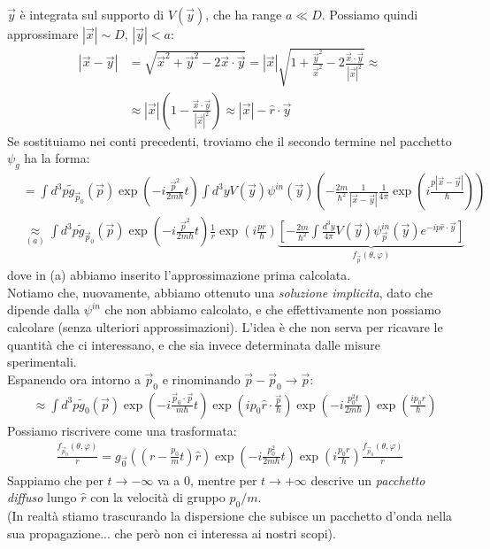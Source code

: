 \documentclass[../../FisicaTeorica.tex]{subfiles}
\begin{document}
$\vec{y}$ è integrata sul supporto di $V(\vec{y})$, che ha range $a \ll D$. Possiamo quindi approssimare $|\vec{x}|\sim D$, $|\vec{y}| < a$:
\begin{align*}
|\vec{x}-\vec{y}|&=\sqrt{\vec{x}^2 + \vec{y}^2 -2\vec{x}\cdot \vec{y}} =|\vec{x}| \sqrt{1+ \frac{\vec{y}^2}{\vec{x}^2} -2\frac{\vec{x}\cdot \vec{y}}{|\vec{x}|^2}} \approx\\
&\approx |\vec{x}| \left(1-\frac{\vec{x}\cdot \vec{y}}{|\vec{x}|^2}\right) \approx |\vec{x}| - \hat{r}\cdot \vec{y}
\end{align*}
Se sostituiamo nei conti precedenti, troviamo che il secondo termine nel pacchetto $\psi_g$ ha la forma:
\begin{align*}
&=\int d^3 p \tilde{g}_{\vec{p}_0}(\vec{p}) \exp\left(-i\frac{\vec{p}^2}{2m\hbar}t\right) \int d^3 y V(\vec{y}) \psi^{in}(\vec{y}) \left(-\frac{2m}{\hbar^2} \frac{1}{|\vec{x}-\vec{y}|} \frac{1}{4\pi} \exp\left(i\frac{p|\vec{x}-\vec{y}|}{\hbar}\right)\right)\\
&\underset{(a)}{\approx} \int d^3 p \tilde{g}_{\vec{p}_0}(\vec{p}) \exp\left(-i\frac{\vec{p}^2}{2m\hbar}t\right) \frac{1}{r} \exp\left(i\frac{pr}{\hbar}\right)\underbrace{ \left[-\frac{2m}{\hbar^2}\int \frac{d^3 y}{4\pi}V(\vec{y})\psi_{\vec{p}}^{in}(\vec{y}) e^{-ip \hat{r}\cdot \vec{y}} \right]}_{f_{\vec{p}}(\theta,\varphi)}
\end{align*}
dove in (a) abbiamo inserito l'approssimazione prima calcolata.\\
Notiamo che, nuovamente, abbiamo ottenuto una \textit{soluzione implicita}, dato che dipende dalla $\psi^{in}$ che non abbiamo calcolato, e che effettivamente non possiamo calcolare (senza ulteriori approssimazioni). L'idea è che non serva per ricavare le quantità che ci interessano, e che sia invece determinata dalle misure sperimentali.\\

Espanendo ora intorno a $\vec{p}_0$ e rinominando $\vec{p}-\vec{p}_0 \to \vec{p}$:
\begin{align*}
&\approx \int d^3 p \tilde{g}_0(\vec{p}) \exp\left(-i\frac{\vec{p}_0\cdot \vec{p}}{m\hbar}t\right) \exp\left(i{p}_0 \hat{r} \cdot \frac{\vec{p}}{\hbar}\right) \exp \left(-i\frac{p_0^2 t}{2m\hbar}\right) \exp\left(\frac{ip_0 r}{\hbar}\right)
\end{align*}
Possiamo riscrivere come una trasformata:
\begin{align*}
\frac{f_{\vec{p}_0}(\theta,\varphi)}{r} = g_{\vec{0}}\left(\left(r-\frac{p_0}{m}t\right)\hat{r}\right) \exp\left(-i\frac{p_0^2}{2m\hbar}t\right) \exp\left(i\frac{p_0 r}{\hbar}\right) \frac{f_{\vec{p}_0}(\theta,\varphi)}{r}
\end{align*}
Sappiamo che per $t\to -\infty$ va a $0$, mentre per $t\to +\infty$ descrive un \textit{pacchetto diffuso} lungo $\hat{r}$ con la velocità di gruppo $p_0/m$.\\
(In realtà stiamo trascurando la dispersione che subisce un pacchetto d'onda nella sua propagazione... che però non ci interessa ai nostri scopi).\\
\end{document}
